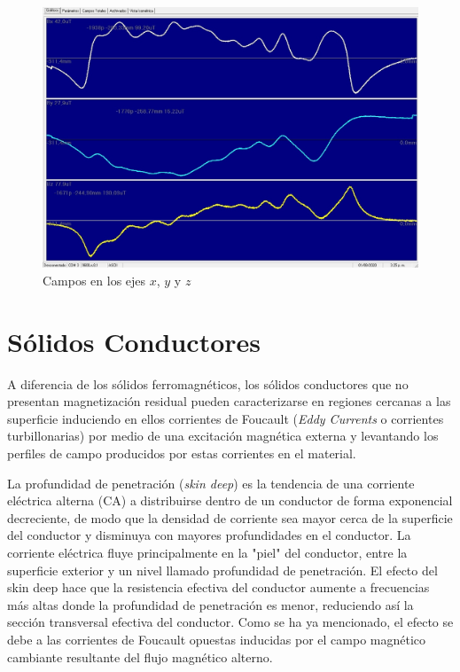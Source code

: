 \begin{figure}[H]
    \centering
    \includegraphics[width=1.0\textwidth]{./Figures/fig56b}
	\caption{Campos en los ejes $x$, $y$ y $z$}
	\label{fig:56}
\end{figure}

\section{Sólidos Conductores}

A diferencia de los sólidos ferromagnéticos, los sólidos conductores que no presentan magnetización residual pueden caracterizarse en regiones cercanas a las superficie induciendo en ellos corrientes de Foucault (\textit{Eddy Currents} o corrientes turbillonarias) por medio de una excitación magnética externa y levantando los perfiles de campo producidos por estas corrientes en el material.

La profundidad de penetración (\textit{skin deep}) es la tendencia de una corriente eléctrica alterna (CA) a distribuirse dentro de un conductor de forma exponencial decreciente, de modo que la densidad de corriente sea mayor cerca de la superficie del conductor y disminuya con mayores profundidades en el conductor. La corriente eléctrica fluye principalmente en la "piel" del conductor, entre la superficie exterior y un nivel llamado profundidad de penetración. El efecto del skin deep hace que la resistencia efectiva del conductor aumente a frecuencias más altas donde la profundidad de penetración es menor, reduciendo así la sección transversal efectiva del conductor. Como se ha ya mencionado, el efecto se debe a las corrientes de Foucault opuestas inducidas por el campo magnético cambiante resultante del flujo magnético alterno.

